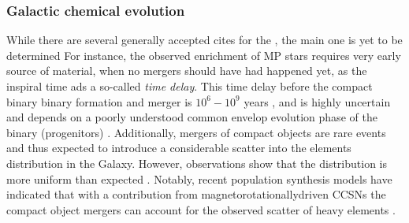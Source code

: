 \subsubsection{Galactic chemical evolution}

While there are several generally accepted cites for the \rproc{}, the main one is yet to be 
determined \citep[\eg][]{Qian:2000bh,Argast:2003he,Matteucci:2014}
%
For instance, the observed \rproc{} enrichment of \ac{MP} stars 
requires very early source of \rproc{} material, when no mergers 
should have had happened yet, as the inspiral time ads a so-called \textit{time delay}.
This time delay before the compact binary binary formation and merger is 
$10^{6} - 10^{9}$ years \citep{DeDonder:2004cx,Dominik:2012kk}, and is highly uncertain and 
depends on a poorly understood common envelop evolution phase of the binary (progenitors)
\citep[\eg]{Dominik:2012kk}. 
Additionally, mergers of compact objects are rare events and thus expected to introduce 
a considerable scatter into the \rproc{} elements distribution in the Galaxy. 
However, observations show that the distribution is more uniform than expected \citep{Argast:2003he}.
Notably, recent population synthesis models have indicated that with a contribution from 
magnetorotationallydriven \acp{CCSN} the compact object mergers can account for the 
observed scatter of heavy elements \citep{Ishimaru:2015,Cescutti:2015,Wehmeyer:2015,VanDeVoort:2015}.
%
